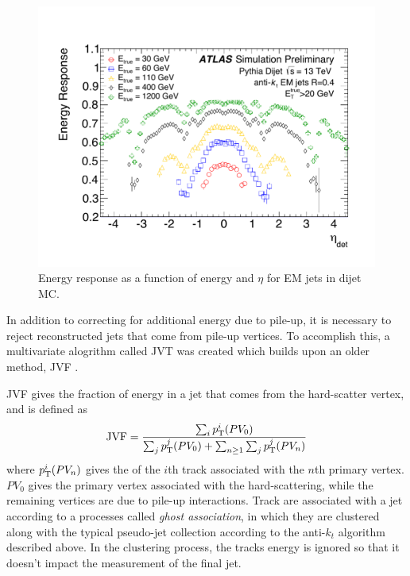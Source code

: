 \begin{centering}
\begin{figure}[!hbt]
\myfloatalign
\includegraphics[width=.9\linewidth]{figures/reco/fig_04a.pdf}
\caption{ Energy response as a function of energy and $\eta$ for \ac{EM} jets in dijet \ac{MC}. \cite{ATL-PHYS-PUB-2015-015} }
\label{fig:reco_JES}
\end{figure}
\end{centering}

In addition to correcting for additional energy due to pile-up, it is necessary to reject reconstructed jets that come from pile-up vertices. To accomplish this, a multivariate alogrithm called \ac{JVT} was created which builds upon an older method, \ac{JVF} \cite{ATLAS-CONF-2014-018}. 

\ac{JVF} gives the fraction of energy in a jet that comes from the hard-scatter vertex, and is defined as 
%
\begin{equation}
\mathrm{JVF} = \frac{\sum_i p_{\text{T}}^i(PV_0)}{\sum_j p_{\text{T}}^j(PV_0) + \sum_{n\geq1} \sum_j p_{\text{T}}^j(PV_n)} 
\end{equation}
%
where $p_{\text{T}}^i(PV_n)$ gives the \pt of the $i$th track associated with the $n$th primary vertex. $PV_0$ gives the primary vertex associated with the hard-scattering, while the remaining vertices are due to pile-up interactions. Track are associated with a jet according to a processes called \textit{ghost association}, in which they are clustered along with the typical pseudo-jet collection according to the anti-$k_t$ algorithm described above. In the clustering process, the tracks energy is ignored so that it doesn't impact the measurement of the final jet. 

